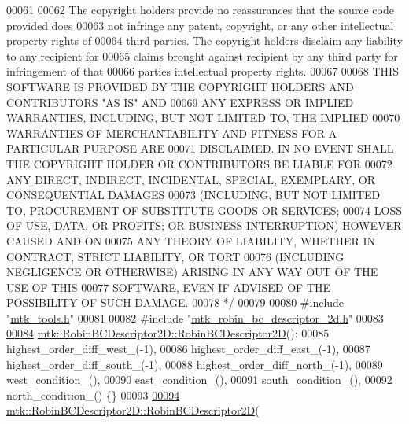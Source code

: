 \begin{DoxyCode}
00061 \textcolor{comment}{}
00062 \textcolor{comment}{The copyright holders provide no reassurances that the source code provided does}
00063 \textcolor{comment}{not infringe any patent, copyright, or any other intellectual property rights of}
00064 \textcolor{comment}{third parties. The copyright holders disclaim any liability to any recipient for}
00065 \textcolor{comment}{claims brought against recipient by any third party for infringement of that}
00066 \textcolor{comment}{parties intellectual property rights.}
00067 \textcolor{comment}{}
00068 \textcolor{comment}{THIS SOFTWARE IS PROVIDED BY THE COPYRIGHT HOLDERS AND CONTRIBUTORS "AS IS" AND}
00069 \textcolor{comment}{ANY EXPRESS OR IMPLIED WARRANTIES, INCLUDING, BUT NOT LIMITED TO, THE IMPLIED}
00070 \textcolor{comment}{WARRANTIES OF MERCHANTABILITY AND FITNESS FOR A PARTICULAR PURPOSE ARE}
00071 \textcolor{comment}{DISCLAIMED. IN NO EVENT SHALL THE COPYRIGHT HOLDER OR CONTRIBUTORS BE LIABLE FOR}
00072 \textcolor{comment}{ANY DIRECT, INDIRECT, INCIDENTAL, SPECIAL, EXEMPLARY, OR CONSEQUENTIAL DAMAGES}
00073 \textcolor{comment}{(INCLUDING, BUT NOT LIMITED TO, PROCUREMENT OF SUBSTITUTE GOODS OR SERVICES;}
00074 \textcolor{comment}{LOSS OF USE, DATA, OR PROFITS; OR BUSINESS INTERRUPTION) HOWEVER CAUSED AND ON}
00075 \textcolor{comment}{ANY THEORY OF LIABILITY, WHETHER IN CONTRACT, STRICT LIABILITY, OR TORT}
00076 \textcolor{comment}{(INCLUDING NEGLIGENCE OR OTHERWISE) ARISING IN ANY WAY OUT OF THE USE OF THIS}
00077 \textcolor{comment}{SOFTWARE, EVEN IF ADVISED OF THE POSSIBILITY OF SUCH DAMAGE.}
00078 \textcolor{comment}{*/}
00079 
00080 \textcolor{preprocessor}{#include "\hyperlink{mtk__tools_8h}{mtk\_tools.h}"}
00081 
00082 \textcolor{preprocessor}{#include "\hyperlink{mtk__robin__bc__descriptor__2d_8h}{mtk\_robin\_bc\_descriptor\_2d.h}"}
00083 
\hypertarget{mtk__robin__bc__descriptor__2d_8cc_source_l00084}{}\hyperlink{classmtk_1_1RobinBCDescriptor2D_a00589475c84facde18949150bd6df961}{00084} \hyperlink{classmtk_1_1RobinBCDescriptor2D_a00589475c84facde18949150bd6df961}{mtk::RobinBCDescriptor2D::RobinBCDescriptor2D}():
00085   highest\_order\_diff\_west\_(-1),
00086   highest\_order\_diff\_east\_(-1),
00087   highest\_order\_diff\_south\_(-1),
00088   highest\_order\_diff\_north\_(-1),
00089   west\_condition\_(),
00090   east\_condition\_(),
00091   south\_condition\_(),
00092   north\_condition\_() \{\}
00093 
\hypertarget{mtk__robin__bc__descriptor__2d_8cc_source_l00094}{}\hyperlink{classmtk_1_1RobinBCDescriptor2D_a996e5ddee3a6f76cb5fa813bfff905d5}{00094} \hyperlink{classmtk_1_1RobinBCDescriptor2D_a00589475c84facde18949150bd6df961}{mtk::RobinBCDescriptor2D::RobinBCDescriptor2D}(

\end{DoxyCode}
